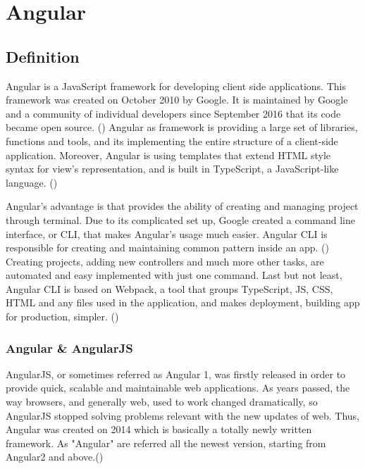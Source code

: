 
\chapter{Angular} %

\label{Chapter4} %

\section{Definition}

Angular is a JavaScript framework for developing client side applications. This framework was created on October 2010 by Google. It is maintained by Google and a community of individual developers since September 2016 that its code became open source. (\cite{Reference6}) Angular as framework is providing a large set of libraries, functions and tools, and its implementing the entire structure of a client-side application. Moreover, Angular is using templates that extend HTML style syntax for view's representation, and is built in TypeScript, a JavaScript-like language. (\cite{Reference19}) \par

Angular's advantage is that provides the ability of creating and managing project through terminal. Due to its complicated set up, Google created a command line interface, or CLI, that makes Angular's usage much easier. Angular CLI is responsible for creating and maintaining common pattern inside an app. (\cite{angularUpandRunning}) Creating projects, adding new controllers and much more other tasks, are automated and easy implemented with just one command. Last but not least, Angular CLI is based on Webpack, a tool that groups TypeScript, JS, CSS, HTML and any files used in the application, and makes deployment, building app for production, simpler. (\cite{murray2018ng}) \par

\subsection{Angular \& AngularJS}

AngularJS, or sometimes referred as Angular 1, was firstly released in order to provide quick, scalable and maintainable web applications. As years passed, the way browsers, and generally web, used to work changed dramatically, so AngularJS stopped solving problems relevant with the new updates of web. Thus, Angular was created on 2014 which is basically a totally newly written framework. As "Angular" are referred all the newest version, starting from Angular2 and above.(\cite{angularUpandRunning}) \par

